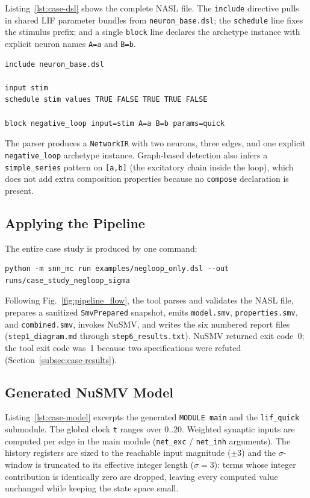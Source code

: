 \documentclass[
]{ceurart}
\begin{document}
Listing~\ref{lst:case-dsl} shows the complete \textsc{NASL} file. The
\texttt{include} directive pulls in shared LIF parameter bundles from
\texttt{neuron\_base.dsl}; the \texttt{schedule} line fixes the stimulus
prefix; and a single \texttt{block} line declares the archetype instance
with explicit neuron names \texttt{A=a} and \texttt{B=b}.

\begin{lstlisting}[style=pythoncode,caption={Case-study \textsc{NASL} file (\texttt{examples/negloop\_only.dsl}).},label=lst:case-dsl]
include neuron_base.dsl

input stim
schedule stim values TRUE FALSE TRUE TRUE FALSE

block negative_loop input=stim A=a B=b params=quick
\end{lstlisting}

The parser produces a \texttt{NetworkIR} with two neurons, three edges,
and one explicit \texttt{negative\_loop} archetype instance. Graph-based detection also
infers a \texttt{simple\_series} pattern on \texttt{[a,b]} (the excitatory chain inside
the loop), which does not add extra composition properties because no \texttt{compose}
declaration is present.

\subsection{Applying the Pipeline}

The entire case study is produced by one command:
\begin{verbatim}
python -m snn_mc run examples/negloop_only.dsl --out runs/case_study_negloop_sigma
\end{verbatim}
Following Fig.~\ref{fig:pipeline_flow}, the tool parses and validates the
\textsc{NASL} file, prepares a sanitized \texttt{SmvPrepared} snapshot,
emits \texttt{model.smv}, \texttt{properties.smv}, and
\texttt{combined.smv}, invokes NuSMV, and writes the six numbered report
files (\texttt{step1\_diagram.md} through \texttt{step6\_results.txt}).
NuSMV returned exit code~0; the tool exit code was~1 because two
specifications were refuted (Section~\ref{subsec:case-results}).

\subsection{Generated NuSMV Model}

Listing~\ref{lst:case-model} excerpts the generated \texttt{MODULE main} and the
\texttt{lif\_quick} submodule. The global clock \texttt{t} ranges over $0..20$. Weighted
synaptic inputs are computed per edge in the main module (\texttt{net\_exc} /
\texttt{net\_inh} arguments). The history registers are sized to the reachable input
magnitude ($\pm 3$) and the $\sigma$-window is truncated to its effective integer length
($\sigma = 3$): terms whose integer contribution is identically zero are dropped, leaving
every computed value unchanged while keeping the state space small.
\end{document}
